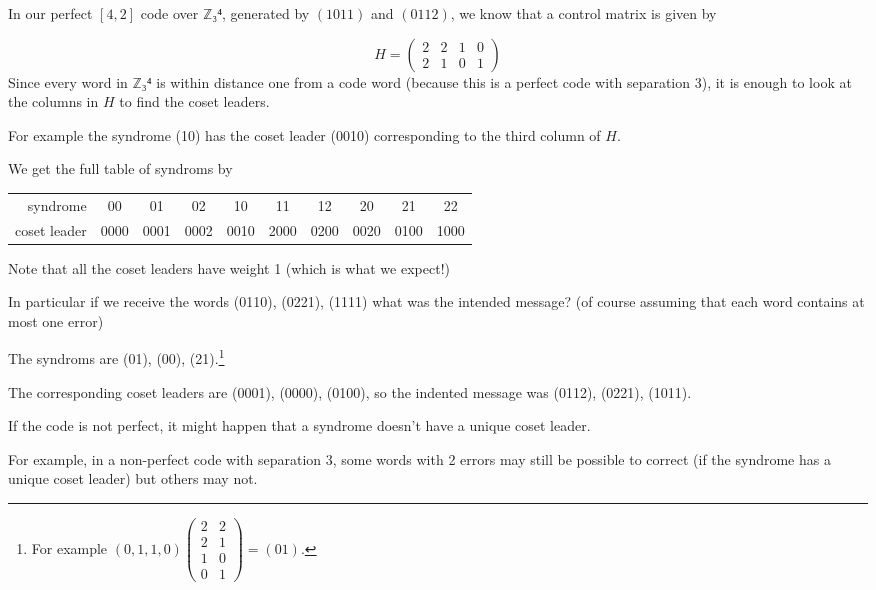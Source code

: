 \documentclass[english]{lbscript}
\begin{document}
\begin{example}{}{}
	In our perfect \([4,2]\) code over \(ℤ₃⁴\), generated by \((1011)\) and \((0112)\), we know that a control matrix is given by

	\begin{equation}
		\label{eq:148}
		H=\begin{pmatrix}
			2 & 2 & 1 & 0 \\
			2 & 1 & 0 & 1
		\end{pmatrix}
	\end{equation}
	Since every word in \(ℤ₃⁴\) is within distance one from a code word (because this is a perfect code with separation 3), it is enough to look at the columns in \(H\) to find the coset leaders.

	For example the syndrome (10) has the coset leader (0010) corresponding to the third column of \(H\).


	We get the full table of syndroms by
	\begin{tabular}{rccccccccc}
		syndrome     & 00   & 01   & 02   & 10   & 11   & 12   & 20   & 21   & 22   \\
		coset leader & 0000 & 0001 & 0002 & 0010 & 2000 & 0200 & 0020 & 0100 & 1000 \\
	\end{tabular}

	Note that all the coset leaders have weight 1 (which is what we expect!)

	In particular if we receive the words (0110), (0221), (1111) what was the intended message? (of course assuming that each word contains at most one error)

	The syndroms are (01), (00), (21).\footnote{For example \((0,1,1,0) \begin{pmatrix}
			2 & 2 \\
			2 & 1 \\
			1 & 0 \\
			0 & 1
		\end{pmatrix}= (0 1)\).}

	The corresponding coset leaders are (0001), (0000), (0100), so the indented message was (0112), (0221), (1011).
\end{example}
\begin{remark}{}{}
	If the code is not perfect, it might happen that a syndrome doesn't have a unique coset leader.

	For example, in a non-perfect code with separation 3, some words with 2 errors may still be possible to correct (if the syndrome has a unique coset leader) but others may not.
\end{remark}
\end{document}
